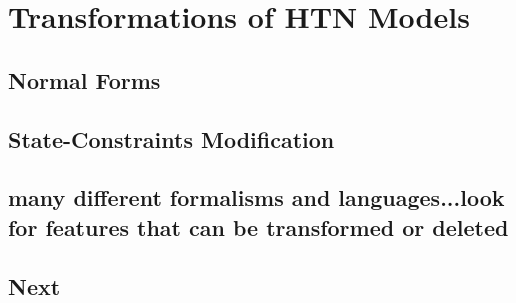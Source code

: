 \chapter{Transformations of {HTN} {M}odels}

\section{Normal Forms}

\section{State-Constraints Modification}

\section{many different formalisms and languages...look for features that can be transformed or deleted}
\cite{hddl}

\section{Next}